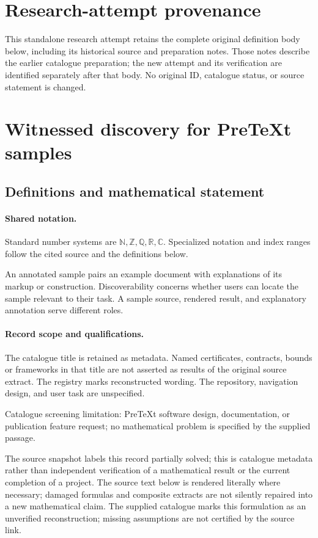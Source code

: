 \documentclass[11pt]{article}
\begin{document}
\section*{Research-attempt provenance}
This standalone research attempt retains the complete original definition body below,
including its historical source and preparation notes. Those notes describe the
earlier catalogue preparation; the new attempt and its verification are identified
separately after that body. No original ID, catalogue status, or source statement is changed.

\section{Witnessed discovery for PreTeXt samples}\label{statement}

\subsection{Definitions and mathematical statement}

\paragraph{Shared notation.}Standard number systems are $\mathbb N,\mathbb Z,\mathbb Q,\mathbb R,\mathbb C$. Specialized notation and index ranges follow the cited source and the definitions below.


An annotated sample pairs an example document with explanations of its markup or construction. Discoverability concerns whether users can locate the sample relevant to their task. A sample source, rendered result, and explanatory annotation serve different roles.
\paragraph{Record scope and qualifications.}
The catalogue title is retained as metadata. Named certificates, contracts, bounds or frameworks in that title are not asserted as results of the original source extract.
The registry marks reconstructed wording. The repository, navigation design, and user task are unspecified.

Catalogue screening limitation: PreTeXt software design, documentation, or publication feature request; no mathematical problem is specified by the supplied passage.

The source snapshot labels this record partially solved; this is catalogue metadata rather than independent verification of a mathematical result or the current completion of a project.
The source text below is rendered literally where necessary; damaged formulas and composite extracts are not silently repaired into a new mathematical claim.
The supplied catalogue marks this formulation as an unverified reconstruction; missing assumptions are not certified by the source link.
\end{document}

